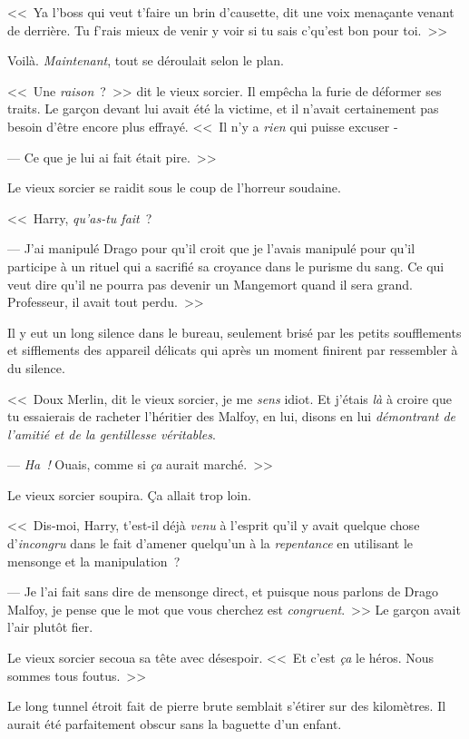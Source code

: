 <<~Ya l'boss qui veut t'faire un brin d'causette, dit une voix menaçante venant de derrière. Tu f'rais mieux de venir y voir si tu sais c'qu'est bon pour toi.~>>

Voilà. \emph{Maintenant}, tout se déroulait selon le plan.


<<~Une \emph{raison}~?~>> dit le vieux sorcier. Il empêcha la furie de déformer ses traits. Le garçon devant lui avait été la victime, et il n'avait certainement pas besoin d'être encore plus effrayé. <<~Il n'y a \emph{rien} qui puisse excuser -

--- Ce que je lui ai fait était pire.~>>

Le vieux sorcier se raidit sous le coup de l'horreur soudaine.

<<~Harry, \emph{qu'as-tu fait}~?

--- J'ai manipulé Drago pour qu'il croit que je l'avais manipulé pour qu'il participe à un rituel qui a sacrifié sa croyance dans le purisme du sang. Ce qui veut dire qu'il ne pourra pas devenir un Mangemort quand il sera grand. Professeur, il avait tout perdu.~>>

Il y eut un long silence dans le bureau, seulement brisé par les petits soufflements et sifflements des appareil délicats qui après un moment finirent par ressembler à du silence.

<<~Doux Merlin, dit le vieux sorcier, je me \emph{sens} idiot. Et j'étais \emph{là} à croire que tu essaierais de racheter l'héritier des Malfoy, en lui, disons en lui \emph{démontrant de l'amitié et de la gentillesse véritables}.

--- \emph{Ha~!} Ouais, comme si \emph{ça} aurait marché.~>>

Le vieux sorcier soupira. Ça allait trop loin.

<<~Dis-moi, Harry, t'est-il déjà \emph{venu} à l'esprit qu'il y avait quelque chose d'\emph{incongru} dans le fait d'amener quelqu'un à la \emph{repentance} en utilisant le mensonge et la manipulation~?

--- Je l'ai fait sans dire de mensonge direct, et puisque nous parlons de Drago Malfoy, je pense que le mot que vous cherchez est \emph{congruent}.~>> Le garçon avait l'air plutôt fier.

Le vieux sorcier secoua sa tête avec désespoir. <<~Et c'est \emph{ça} le héros. Nous sommes tous foutus.~>>


Le long tunnel étroit fait de pierre brute semblait s'étirer sur des kilomètres. Il aurait été parfaitement obscur sans la baguette d'un enfant.

